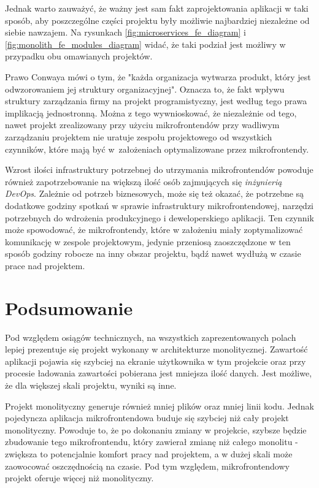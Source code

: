 \documentclass{SGGW-thesis}
\begin{document}
  Jednak warto zauważyć, że ważny jest sam fakt zaprojektowania aplikacji w taki sposób, aby poszczególne części projektu były możliwie najbardziej niezależne od siebie nawzajem. Na rysunkach \cref{fig:microservices_fe_diagram} i \cref{fig:monolith_fe_modules_diagram} widać, że taki podział jest możliwy w przypadku obu omawianych projektów.

  Prawo Conwaya \cite{conway} mówi o tym, że "każda organizacja wytwarza produkt, który jest odwzorowaniem jej struktury organizacyjnej". Oznacza to, że fakt wpływu struktury zarządzania firmy na projekt programistyczny, jest według tego prawa implikacją jednostronną. Można z tego wywnioskować, że niezależnie od tego, nawet projekt zrealizowany przy użyciu mikrofrontendów przy wadliwym zarządzaniu projektem nie uratuje zespołu projektowego od wszystkich czynników, które mają być w~założeniach optymalizowane przez mikrofrontendy.

  Wzrost ilości infrastruktury potrzebnej do utrzymania mikrofrontendów powoduje również zapotrzebowanie na większą ilość osób zajmujących się \textit{inżynierią DevOps}. Zależnie od potrzeb biznesowych, może się też okazać, że potrzebne są dodatkowe godziny spotkań w sprawie infrastruktury mikrofrontendowej, narzędzi potrzebnych do wdrożenia produkcyjnego i deweloperskiego aplikacji. Ten czynnik może spowodować, że mikrofrontendy, które w założeniu miały zoptymalizować komunikację w zespole projektowym, jedynie przeniosą zaoszczędzone w ten sposób godziny robocze na inny obszar projektu, bądź nawet wydłużą w czasie prace nad projektem.

\chapter{Podsumowanie}
Pod względem osiągów technicznych, na wszystkich zaprezentowanych polach lepiej prezentuje się projekt wykonany w architekturze monolitycznej. Zawartość aplikacji pojawia się szybciej na ekranie użytkownika w tym projekcie oraz przy procesie ładowania zawartości pobierana jest mniejsza ilość danych. Jest możliwe, że dla większej skali projektu, wyniki są inne.

Projekt monolityczny generuje również mniej plików oraz mniej linii kodu. Jednak pojedyncza aplikacja mikrofrontendowa buduje się szybciej niż cały projekt monolityczny. Powoduje to, że po dokonaniu zmiany w projekcie, szybsze będzie zbudowanie tego mikrofrontendu, który zawierał zmianę niż całego monolitu - zwiększa to potencjalnie komfort pracy nad projektem, a w dużej skali może zaowocować oszczędnością na czasie. Pod tym względem, mikrofrontendowy projekt oferuje więcej niż monolityczny.
\end{document}
